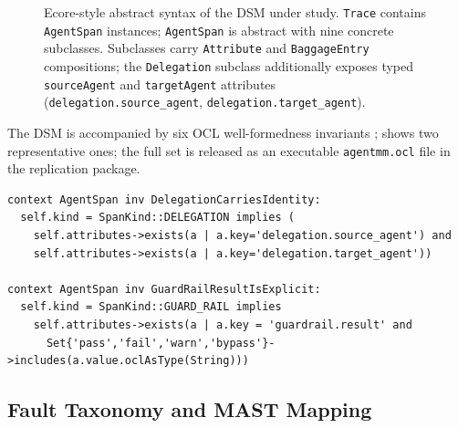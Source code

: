 \documentclass[a4paper,UKenglish,cleveref,autoref,thm-restate]{lipics-v2021}
\begin{document}
\begin{figure}[t]
\caption{Ecore-style abstract syntax of the DSM under study.
\texttt{Trace} contains \texttt{AgentSpan} instances; \texttt{AgentSpan}
is abstract with nine concrete subclasses.  Subclasses carry
\texttt{Attribute} and \texttt{BaggageEntry} compositions; the
\texttt{Delegation} subclass additionally exposes typed
\texttt{sourceAgent} and \texttt{targetAgent} attributes
(\texttt{delegation.source\_agent}, \texttt{delegation.target\_agent}).}
\label{fig:metamodel}
\end{figure}

The DSM is accompanied by six OCL well-formedness invariants
\cite{anon-ocl};  shows two representative ones; the
full set is released as an executable \texttt{agentmm.ocl} file in
the replication package.

\begin{lstlisting}[language=OCL,caption={Two representative OCL invariants of the DSM (full set of six in \texttt{agentmm.ocl}).},label={lst:ocl},float]
context AgentSpan inv DelegationCarriesIdentity:
  self.kind = SpanKind::DELEGATION implies (
    self.attributes->exists(a | a.key='delegation.source_agent') and
    self.attributes->exists(a | a.key='delegation.target_agent'))

context AgentSpan inv GuardRailResultIsExplicit:
  self.kind = SpanKind::GUARD_RAIL implies
    self.attributes->exists(a | a.key = 'guardrail.result' and
      Set{'pass','fail','warn','bypass'}->includes(a.value.oclAsType(String)))
\end{lstlisting}

\subsection{Fault Taxonomy and MAST Mapping}
\label{sec:taxonomy}
\end{document}
